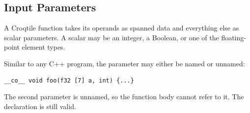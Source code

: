\subsection*{Input Parameters}

A Croqtile function takes its operands as spanned data and everything else as scalar parameters. A scalar may be an integer, a Boolean, or one of the floating-point element types.

Similar to any C++ program, the parameter may either be named or unnamed:

\begin{lstlisting}[language=croqtile,caption={Input Parameters}]
__co__ void foo(f32 [7] a, int) {...}
\end{lstlisting}

The second parameter is unnamed, so the function body cannot refer to it. The declaration is still valid.
